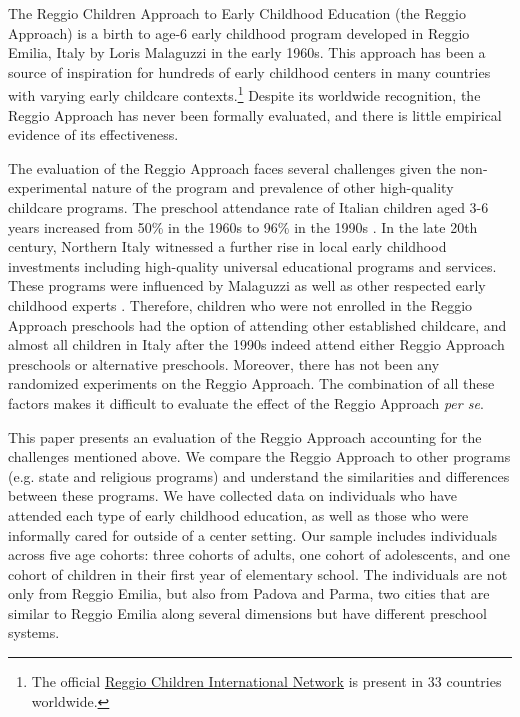 
The Reggio Children Approach to Early Childhood Education (the Reggio Approach) is a birth to age-6 early childhood program developed in Reggio Emilia, Italy by Loris Malaguzzi in the early 1960s. This approach has been a source of inspiration for hundreds of early childhood centers in many countries with varying early childcare contexts.\footnote{The official \href{http://www.reggiochildren.it/network/?lang=en}{Reggio Children International Network} is present in 33 countries worldwide.} Despite its worldwide recognition, the Reggio Approach has never been formally evaluated, and there is little empirical evidence of its effectiveness. 

The evaluation of the Reggio Approach faces several challenges given the non-experimental nature of the program and prevalence of other high-quality childcare programs. The preschool attendance rate of Italian children aged 3-6 years increased from 50\% in the 1960s to 96\% in the 1990s \citep{Hohnerlein_2015_Development-and-Diffusion}. In the late 20th century, Northern Italy witnessed a further rise in local early childhood investments including high-quality universal educational programs and services. These programs were influenced by Malaguzzi as well as other respected early childhood experts \citep{OECD_2001_Italy-Country-Note}. Therefore, children who were not enrolled in the Reggio Approach preschools had the option of attending other established childcare, and almost all children in Italy after the 1990s indeed attend either Reggio Approach preschools or alternative preschools. Moreover, there has not been any randomized experiments on the Reggio Approach. The combination of all these factors makes it difficult to evaluate the effect of the Reggio Approach \textit{per se}. 

This paper presents an evaluation of the Reggio Approach accounting for the challenges mentioned above. We compare the Reggio Approach to other programs (e.g. state and religious programs) and understand the similarities and differences between these programs. We have collected data on individuals who have attended each type of early childhood education, as well as those who were informally cared for outside of a center setting. Our sample includes individuals across five age cohorts: three cohorts of adults, one cohort of adolescents, and one cohort of children in their first year of elementary school. The individuals are not only from Reggio Emilia, but also from Padova and Parma, two cities that are similar to Reggio Emilia along several dimensions but have different preschool systems.  

